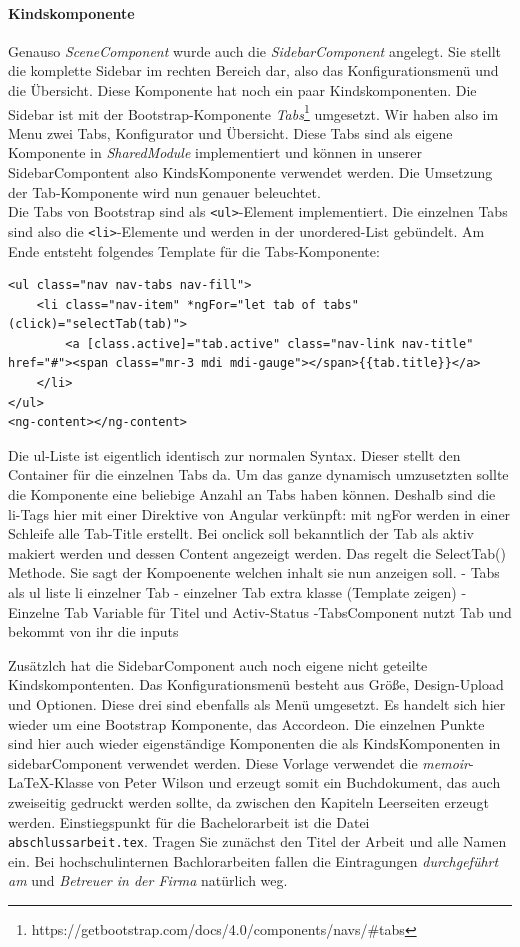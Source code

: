 \paragraph{Kindskomponente}
Genauso \textit{SceneComponent} wurde auch die \textit{SidebarComponent} angelegt. Sie stellt die komplette Sidebar im rechten Bereich dar, also das Konfigurationsmenü und die Übersicht. Diese Komponente hat noch ein paar Kindskomponenten. Die Sidebar ist mit der Bootstrap-Komponente \textit{Tabs}\footnote{https://getbootstrap.com/docs/4.0/components/navs/\#tabs} umgesetzt. Wir haben also im Menu zwei Tabs, Konfigurator und Übersicht. Diese Tabs sind als eigene Komponente in \textit{SharedModule} implementiert und können in unserer SidebarCompontent also KindsKomponente verwendet werden. Die Umsetzung der Tab-Komponente wird nun genauer beleuchtet.\\
Die Tabs von Bootstrap sind als \texttt{<ul>}-Element implementiert. Die einzelnen Tabs sind also die \texttt{<li>}-Elemente und werden in der unordered-List gebündelt. Am Ende entsteht folgendes Template für die Tabs-Komponente:
%
\begin{lstlisting}
<ul class="nav nav-tabs nav-fill">
	<li class="nav-item" *ngFor="let tab of tabs" (click)="selectTab(tab)">
		<a [class.active]="tab.active" class="nav-link nav-title" href="#"><span class="mr-3 mdi mdi-gauge"></span>{{tab.title}}</a>
	</li>
</ul>
<ng-content></ng-content>
\end{lstlisting}
%
Die ul-Liste ist eigentlich identisch zur normalen Syntax. Dieser stellt den Container für die einzelnen Tabs da. Um das ganze dynamisch umzusetzten sollte die Komponente eine beliebige Anzahl an Tabs haben können. Deshalb sind die li-Tags hier mit einer Direktive von Angular verkünpft: mit ngFor werden in einer Schleife alle Tab-Title erstellt. Bei onclick soll bekanntlich der Tab als aktiv makiert werden und dessen Content angezeigt werden. Das regelt die SelectTab() Methode. Sie sagt der Kompoenente welchen inhalt sie nun anzeigen soll.
- Tabs als ul liste li einzelner Tab
- einzelner Tab extra klasse (Template zeigen)
- Einzelne Tab Variable für Titel und Activ-Status
-TabsComponent nutzt Tab und bekommt von ihr die inputs



Zusätzlch hat die SidebarComponent auch noch eigene nicht geteilte Kindskompontenten. Das Konfigurationsmenü besteht aus Größe, Design-Upload und Optionen. Diese drei sind ebenfalls als Menü umgesetzt. Es handelt sich hier wieder um eine Bootstrap Komponente, das Accordeon. Die einzelnen Punkte sind hier auch wieder eigenständige Komponenten die als KindsKomponenten in sidebarComponent verwendet werden.
Diese Vorlage verwendet die \textit{memoir}-LaTeX-Klasse von Peter Wilson und erzeugt somit ein Buchdokument, das auch zweiseitig gedruckt werden sollte, da zwischen den Kapiteln Leerseiten erzeugt werden. Einstiegspunkt für die Bachelorarbeit ist die Datei \texttt{abschlussarbeit.tex}. Tragen Sie zunächst den Titel der Arbeit und alle Namen ein. Bei hochschulinternen Bachlorarbeiten fallen die Eintragungen \textit{durchgeführt am} und \textit{Betreuer in der Firma} natürlich weg.
%
